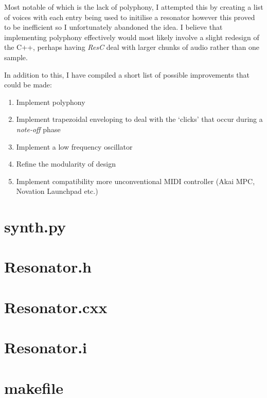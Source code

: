 \documentclass{article}
\begin{document}
\medskip Most notable of which is the lack of polyphony, I attempted this by creating a list of voices with each entry being used to initilise a resonator however this proved to be inefficient so I unfortunately abandoned the idea. I believe that implementing polyphony effectively would most likely involve a slight redesign of the C++, perhaps having \textit{ResC} deal with larger chunks of audio rather than one sample.

\medskip In addition to this, I have compiled a short list of possible improvements that could be made:

\begin{enumerate}
	\item Implement polyphony
	\item Implement trapezoidal enveloping to deal with the `clicks' that occur during a \textit{note-off} phase
	\item Implement a low frequency oscillator
	\item Refine the modularity of design
	\item Implement compatibility more unconventional MIDI controller (Akai MPC, Novation Launchpad etc.)
\end{enumerate}
 
\pagebreak
\appendix
\section{synth.py}

\pagebreak
\section{Resonator.h}

\section{Resonator.cxx}

\pagebreak
\section{Resonator.i}

\section{makefile}

\end{document}
